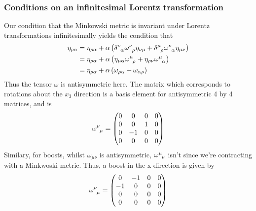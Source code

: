 \documentclass[11pt, oneside]{article}   	%
\theoremstyle{newline}
\theoremstyle{newline}
\theoremstyle{newline}
\theoremstyle{newline}
\theoremstyle{newline}
\begin{document}
\subsubsection*{Conditions on an infinitesimal Lorentz transformation} 
Our condition that the Minkowski metric is invariant under Lorentz transformations infinitesimally yields the condition that 
\begin{align*}
\eta _{\rho \alpha} & = \eta_{\rho \alpha} + \alpha \left( \delta\indices{^\nu_\alpha} \omega\indices{^\nu_\rho} \eta_{\nu \mu}  + \delta\indices{^\mu_\rho} \omega\indices{^\nu_\alpha} \eta_{\mu \nu}\right)  \\
&= \eta_{\rho\alpha} + \alpha \left( \eta_{\mu \alpha} \omega\indices{^\mu_\rho} + \eta_{\rho\nu}\omega\indices{^\mu _\alpha}  \right) \\
&= \eta_{\rho\alpha}  + \alpha\left(  \omega_{\rho \alpha} + \omega_{\alpha \rho} \right) 
\end{align*}
Thus the tensor $\omega$ is antisymmetric here. The matrix which corresponds to rotations about the $x_3 $ direction is a basis element for antisymmetric 4 by 4 matrices, and is 
\[ 
\omega\indices{^\nu_\mu} = \begin{pmatrix} 0 & 0 & 0 & 0 \\
0 & 0 & 1 & 0 \\
0 & - 1 & 0 & 0 \\
0 & 0 & 0 & 0 
\end{pmatrix} 
\] 
Similary, for boosts, whilst $\omega_{ \mu \nu } $ is antisymmetric, $\omega\indices{^\mu_\nu} $ isn't since we're contracting with a Minkwoski metric. Thus, a boost in the x direction is given by 
\[ 
\omega\indices{^\nu_\mu} = \begin{pmatrix} 0 & -1 & 0 & 0 \\
			-1 & 0 & 0 & 0 \\
			0 & 0 & 0 & 0 \\
			0 & 0 & 0 & 0 
\end{pmatrix} 
\] 


\pagebreak  
\end{document}
